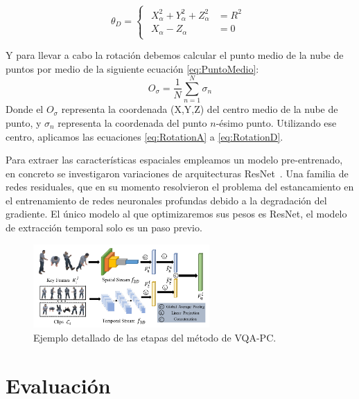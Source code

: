 \begin{equation}
  \theta_D = 
\begin{cases}
\begin{aligned}
   X_\alpha^2 + Y_\alpha^2 + Z_\alpha^2 & = R^2 \\ 
    X_\alpha - Z_\alpha & = 0 
\end{aligned}
\end{cases}
\label{eq:RotationD}
\end{equation}

Y para llevar a cabo la rotación debemos calcular el punto medio de la nube 
de puntos por medio de la siguiente ecuación \eqref{eq:PuntoMedio}:
\begin{equation}
  O_\sigma = \frac{1}{N}\sum_{n=1}^N \sigma_n
  \label{eq:PuntoMedio}
\end{equation}
Donde el $O_\sigma$ representa la coordenada (X,Y,Z) del centro medio de la 
nube de punto, y $\sigma_n$ representa la coordenada del punto $n$-ésimo punto. 
Utilizando ese centro, aplicamos las ecuaciones \eqref{eq:RotationA} a \eqref{eq:RotationD}.

Para extraer las características espaciales empleamos un modelo pre-entrenado, 
en concreto se investigaron variaciones de arquitecturas ResNet~\cite{ResNet}. Una 
familia de redes residuales, que en su momento resolvieron el problema 
del estancamiento en el entrenamiento de redes neuronales profundas debido 
a la degradación del gradiente. El único modelo al que optimizaremos sus pesos es 
ResNet, el modelo de extracción temporal solo es un paso previo.

\begin{figure}[H]
  \begin{center}
    \includegraphics[width=0.60\textwidth]{imagenes/chapter4/PipelineCompleto}
  \end{center}
  \caption{Ejemplo detallado de las etapas del método de VQA-PC.}
  \label{fig:VQAPipeline}
\end{figure}

\section{Evaluación}
